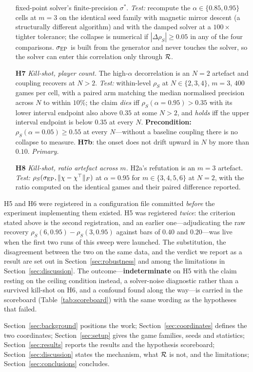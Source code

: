 \begin{itemize}
fixed-point solver's finite-precision $\sigma^*$. \emph{Test:} recompute the
$\alpha\in\{0.85,0.95\}$ cells at $m=3$ on the identical seed family with magnetic mirror
descent (a structurally different algorithm) and with the damped solver at a $100\times$
tighter tolerance; the collapse is numerical if $|\Delta\rho_S|\ge0.05$ in any of the four
comparisons. $\EPR$ is built from the generator and never touches the solver, so the solver
can enter this correlation only through $\R$.
\item[\textbf{H7}] \emph{Kill-shot, player count.} The high-$\alpha$ decorrelation is an
$N=2$ artefact and coupling recovers at $N>2$. \emph{Test:} within-level $\rho_S$ at
$N\in\{2,3,4\}$, $m=3$, $400$ games per cell, with a paired arm matching the median
normalised precision across $N$ to within $10\%$; the claim \emph{dies} iff
$\rho_S(\alpha{=}0.95)>0.35$ with its lower interval endpoint also above $0.35$ at some
$N>2$, and \emph{holds} iff the upper interval endpoint is below $0.35$ at every $N$.
\textbf{Precondition:} $\rho_S(\alpha{=}0.05)\ge0.55$ at every $N$---without a baseline
coupling there is no collapse to measure. \textbf{H7b}: the onset does not drift upward in
$N$ by more than $0.10$. \emph{Primary.}
\item[\textbf{H8}] \emph{Kill-shot, ratio artefact across $m$.} H2a's refutation is an
$m=3$ artefact. \emph{Test:} $\rho_S(\sigma_{\mathrm{EP}},\|\chi-\chi^{\top}\|_F)$ at $\alpha=0.95$ for
$m\in\{3,4,5,6\}$ at $N=2$, with the ratio computed on the identical games and their
paired difference reported.
\end{itemize}

\noindent H5 and H6 were registered in a configuration file committed \emph{before} the
experiment implementing them existed. H5 was registered \emph{twice}: the criterion stated
above is the second registration, and an earlier one---adjudicating the raw recovery
$\rho_S(6,0.95)-\rho_S(3,0.95)$ against bars of $0.40$ and $0.20$---was live when the first
two runs of this sweep were launched. The substitution, the disagreement between the two on
the same data, and the verdict we report as a result are set out in
Section~\ref{sec:robustness} and among the limitations in Section~\ref{sec:discussion}. The
outcome---\textbf{indeterminate} on H5 with the claim resting on the ceiling condition
instead, a solver-noise diagnostic rather than a survived kill-shot on H6, and a confound
found along the way---is carried in the scoreboard (Table~\ref{tab:scoreboard}) with the same
wording as the hypotheses that failed.

Section~\ref{sec:background} positions the work; Section~\ref{sec:coordinates} defines the
two coordinates; Section~\ref{sec:setup} gives the game families, seeds and statistics;
Section~\ref{sec:results} reports the results and the hypothesis scoreboard;
Section~\ref{sec:discussion} states the mechanism, what $\R$ is not, and the limitations;
Section~\ref{sec:conclusions} concludes.
